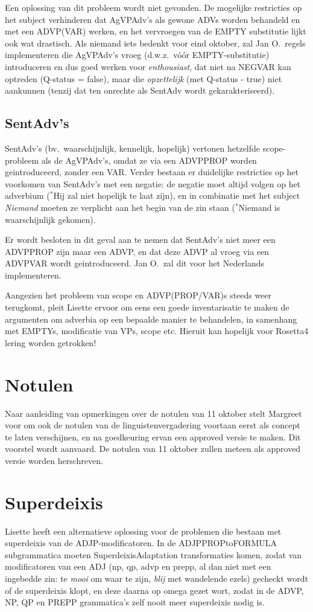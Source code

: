 Een oplossing van dit probleem wordt niet gevonden. De mogelijke restricties op 
het subject verhinderen dat AgVPAdv's als gewone 
ADVs worden behandeld en met een ADVP(VAR) werken, en het vervroegen van 
de EMPTY substitutie lijkt ook wat drastisch. Als niemand iets bedenkt voor 
eind oktober, zal Jan O.\ regels implementeren die AgVPAdv's vroeg (d.w.z.\ 
v\'{o}\'{o}r EMPTY-substitutie) introduceren en dus goed werken voor 
{\em enthousiast\/}, dat niet na NEGVAR kan optreden (Q-status = false), 
maar die {\em opzettelijk\/} (met Q-status - true) niet aankunnen (tenzij dat 
ten onrechte als SentAdv wordt gekarakteriseerd).

\subsection{SentAdv's}
SentAdv's (bv.\ waarschijnlijk, kennelijk, hopelijk) vertonen  hetzelfde 
scope-probleem als de AgVPAdv's, omdat ze via een ADVPPROP worden 
geintroduceerd, zonder een VAR. Verder bestaan er duidelijke restricties op 
het voorkomen van SentAdv's met een negatie: de negatie moet altijd volgen op
het adverbium ($^{*}$Hij zal niet hopelijk te laat zijn), en in combinatie met 
het subject {\em Niemand\/} moeten ze verplicht aan het begin van de zin staan 
($^{*}$Niemand is waarschijnlijk gekomen).

Er wordt besloten in dit geval aan te nemen dat SentAdv's niet meer een 
ADVPPROP zijn maar een ADVP, en dat deze ADVP al vroeg via een ADVPVAR wordt
geintroduceerd. Jan O.\ zal dit voor het Nederlands implementeren. 

Aangezien het probleem van scope en ADVP(PROP/VAR)s steeds weer terugkomt, 
pleit Lisette ervoor om eens een goede inventarisatie te maken de argumenten 
om adverbia op een bepaalde manier te behandelen, in samenhang met EMPTYs, 
modificatie van VPs, scope etc. Hieruit kan hopelijk voor Rosetta4 lering 
worden getrokken!

\section{Notulen}
Naar aanleiding van opmerkingen over de notulen van 11 oktober stelt Margreet 
voor om ook de notulen van de linguistenvergadering voortaan eerst als concept te 
laten verschijnen, en na goedkeuring ervan een approved versie te maken. Dit
voorstel wordt aanvaard. De notulen van 11 oktober zullen meteen als approved 
versie worden herschreven.

\section{Superdeixis}
Lisette heeft een alternatieve oplossing voor de problemen die bestaan met 
superdeixis van de ADJP-modificatoren. In de ADJPPROPtoFORMULA subgrammatica 
moeten SuperdeixisAdaptation transformaties komen, zodat van modificatoren 
van een ADJ (np, qp, advp en prepp, al dan niet met een ingebedde zin: 
te {\em mooi\/} om waar 
te zijn, {\em blij\/} met wandelende ezels) gecheckt wordt of de superdeixis 
klopt, en deze daarna op omega gezet wort, zodat in de ADVP, NP, QP en PREPP 
grammatica's zelf nooit meer superdeixis nodig is.

